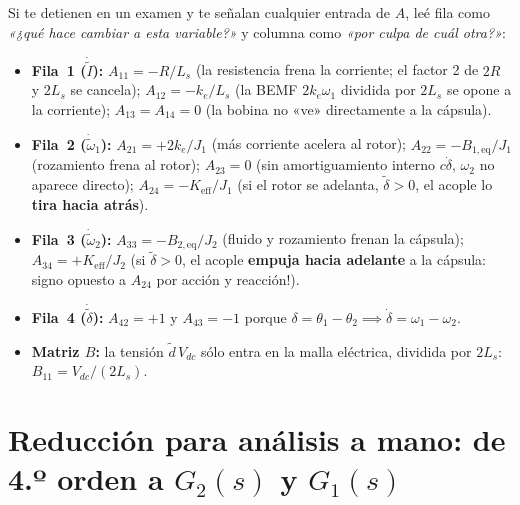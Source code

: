\documentclass[11pt,a4paper,oneside]{book}
\begin{document}
\begin{lectura}
Si te detienen en un examen y te señalan cualquier entrada de $A$, leé fila
como \emph{«¿qué hace cambiar a esta variable?»} y columna como \emph{«por culpa
de cuál otra?»}:
\begin{itemize}
  \item \textbf{Fila~1 ($\dot{\tilde I}$):} $A_{11} = -R/L_s$ (la resistencia frena
        la corriente; el factor 2 de $2R$ y $2L_s$ se cancela); $A_{12} = -k_e/L_s$
        (la BEMF $2k_e\omega_1$ dividida por $2L_s$ se opone a la corriente);
        $A_{13} = A_{14} = 0$ (la bobina no «ve» directamente a la cápsula).
  \item \textbf{Fila~2 ($\dot{\tilde\omega}_1$):} $A_{21} = +2k_e/J_1$ (más corriente
        acelera al rotor); $A_{22} = -B_{1,\text{eq}}/J_1$ (rozamiento frena al
        rotor); $A_{23} = 0$ (sin amortiguamiento interno $c\dot\delta$, $\omega_2$
        no aparece directo); $A_{24} = -K_{\text{eff}}/J_1$ (si el rotor se
        adelanta, $\tilde\delta > 0$, el acople lo \textbf{tira hacia atrás}).
  \item \textbf{Fila~3 ($\dot{\tilde\omega}_2$):} $A_{33} = -B_{2,\text{eq}}/J_2$
        (fluido y rozamiento frenan la cápsula); $A_{34} = +K_{\text{eff}}/J_2$
        (si $\tilde\delta > 0$, el acople \textbf{empuja hacia adelante} a la
        cápsula: signo opuesto a $A_{24}$ por acción y reacción!).
  \item \textbf{Fila~4 ($\dot{\tilde\delta}$):} $A_{42} = +1$ y $A_{43} = -1$
        porque $\delta = \theta_1 - \theta_2 \implies \dot\delta = \omega_1 - \omega_2$.
  \item \textbf{Matriz $B$:} la tensión $\tilde d\,V_{dc}$ sólo entra en la
        malla eléctrica, dividida por $2L_s$: $B_{11} = V_{dc}/(2L_s)$.
\end{itemize}
\end{lectura}

\section{Reducción para análisis a mano: de 4.º orden a \texorpdfstring{$G_2(s)$ y $G_1(s)$}{G2(s) y G1(s)}}
\end{document}
